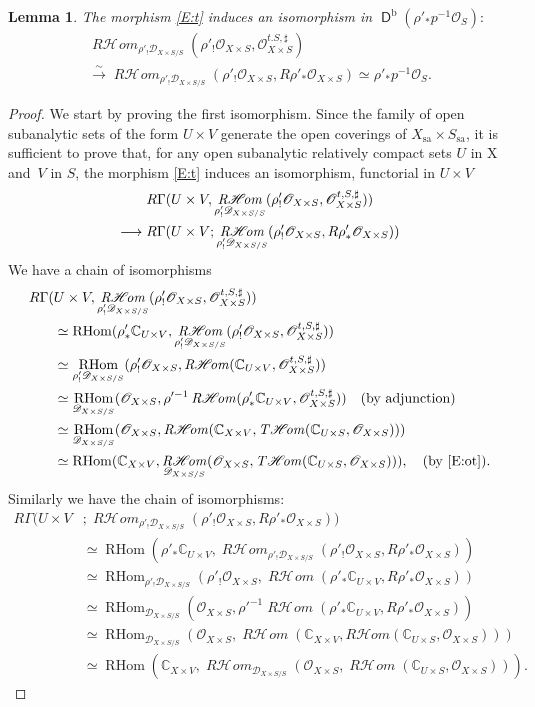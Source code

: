 \documentclass[english]{smfart}
\numberwithin{subsection}{section}
\def\shd{\mathcal{D}}\let\cD\shd
\def\sho{\mathcal{O}}\let\cO\sho
\newcommand{\C}{\mathbb{C}}\let\CC\C
\newcommand{\Rhom}{R\shhom}
\newcommand{\shhom}{\mathcal{H}\!\mathit{om}}\let\ho\shhom
\DeclareMathOperator{\rh}{\mathit{R}\shhom}
\DeclareMathOperator{\tho}{\mathit{T}\shhom}
\DeclareMathOperator{\Rh}{\mathrm{RHom}}
\newcommand{\rb}{\mathrm{b}}
\newcommand{\sa}{\mathrm{sa}}
\newcommand{\XS}{X\times S}
\newcommand{\DXS}{\shd_{\XS/S}}
\DeclareMathOperator{\rD}{\mathsf{D}}
\newcommand{\pOS}{p^{-1}\sho_S}
\numberwithin{equation}{section}
\theoremstyle{plain}
\newtheorem{lemma}[equation]{Lemma}
\theoremstyle{definition}
\def\to{\mathchoice{\longrightarrow}{\rightarrow}{\rightarrow}{\rightarrow}}
\def\isom{\stackrel{\sim}{\longrightarrow}}
\begin{document}
\begin{lemma}\label{L.201}
The morphism \eqref{E:t} induces an isomorphism in $\rD^\rb(\rho'_*\pOS):$
\begin{multline*}
\rh_{\rho'_!\DXS}(\rho'_!\cO_{\XS}, \cO_{\XS}^{t.S,\sharp})\\
\isom\rh_{\rho'_!\DXS}(\rho'_!\cO_{\XS}, R\rho'_*\sho_{\XS})\simeq \rho'_*\pOS.
\end{multline*}
\end{lemma}

\begin{proof}
We start by proving the first isomorphism. Since the family of open subanalytic sets of the form $U\times V$ generate the open coverings of $X_{\sa}\times S_{\sa}$, it is sufficient to prove that, for any open subanalytic relatively compact sets $U$ in X and~$V$ in $S$, the morphism \eqref{E:t} induces an isomorphism, functorial in $U\times V$
\begin{multline*}
R\Gamma(U\times V,\rh_{\rho'_!\DXS}(\rho'_!\cO_{\XS}, \cO_{\XS}^{t,S,\sharp}))\\ \to R\Gamma(U\times V;\rh_{\rho'_!\DXS}(\rho'_!\sho_{\XS},R\rho'_* \sho_{\XS}))
\end{multline*}
We have a chain of isomorphisms
\begin{align*}
R\Gamma(&U\times V,\rh_{\rho'_!\DXS}(\rho'_!\cO_{\XS}, \cO_{\XS}^{t,S,\sharp}))\\
&\simeq \Rh(\rho'_*\CC_{U\times V},\rh_{\rho'_!\DXS}(\rho'_!\cO_{\XS}, \cO_{\XS}^{t,S,\sharp}))\\
&\simeq \Rh_{\rho'_!\DXS}(\rho'_!\cO_{\XS}, \rh(\CC_{U\times V}, \cO_{\XS}^{t,S,\sharp}))\\
&\simeq \Rh_{\DXS}(\cO_{\XS}, \rho'^{-1}\rh(\rho'_*\CC_{U\times V},\cO_{\XS}^{t,S,\sharp}))\quad\text{(by adjunction)}\\
&\simeq \Rh_{\DXS}(\cO_{\XS}, \rh(\CC_{X\times V}, \tho(\CC_{U \times S},\sho_{\XS})))\\
&\simeq \Rh(\CC_{X\times V}, \rh_{\DXS}(\cO_{\XS}, \tho(\CC_{U \times S},\sho_{\XS}))),\quad\text{(by \eqref{E:ot})}.
\end{align*}
Similarly we have the chain of isomorphisms:
\begin{align*}
R\Gamma(U\times V&;\rh_{\rho'_!\DXS}(\rho'_!\sho_{\XS},R\rho'_* \sho_{\XS}))\\
&\simeq \Rh(\rho'_*\C_{U\times V},\rh_{\rho'_!\DXS}(\rho'_!\sho_{\XS},R\rho'_*\sho_{\XS}))\\
&\simeq \Rh_{\rho'_!\DXS}(\rho'_!\sho_{\XS},\rh(\rho'_*\C_{U\times V},R\rho'_*\sho_{\XS}))\\
&\simeq \Rh_{\DXS}(\sho_{\XS},\rho'^{-1}\rh(\rho'_*\C_{U\times V},R\rho'_*\sho_{\XS}))\\
&\simeq \Rh_{\DXS}(\sho_{\XS},\rh(\C_{X\times V},\Rhom(\C_{U \times S},\sho_{\XS})))\\
&\simeq\Rh(\C_{X\times V},\rh_{\DXS}(\sho_{\XS},\rh(\C_{U \times S},\sho_{\XS}))).
\end{align*}


\end{proof}
\end{document}
